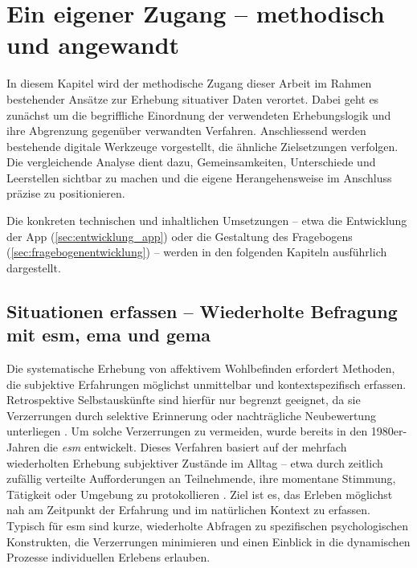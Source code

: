 
\section{Ein eigener Zugang -- methodisch und angewandt} \label{sec:methodik}

In diesem Kapitel wird der methodische Zugang dieser Arbeit im Rahmen bestehender Ansätze zur Erhebung situativer Daten verortet. Dabei geht es zunächst um die begriffliche Einordnung der verwendeten Erhebungslogik und ihre Abgrenzung gegenüber verwandten Verfahren. Anschliessend werden bestehende digitale Werkzeuge vorgestellt, die ähnliche Zielsetzungen verfolgen. Die vergleichende Analyse dient dazu, Gemeinsamkeiten, Unterschiede und Leerstellen sichtbar zu machen und die eigene Herangehensweise im Anschluss präzise zu positionieren.


Die konkreten technischen und inhaltlichen Umsetzungen -- etwa die Entwicklung der App (\cref{sec:entwicklung_app}) oder die Gestaltung des Fragebogens (\cref{sec:fragebogenentwicklung}) -- werden in den folgenden Kapiteln ausführlich dargestellt.


\subsection{Situationen erfassen -- Wiederholte Befragung mit \acrshort{esm}, \acrshort{ema} und \acrshort{gema}}

Die systematische Erhebung von affektivem Wohlbefinden erfordert Methoden, die subjektive Erfahrungen möglichst unmittelbar und kontextspezifisch erfassen. Retrospektive Selbstauskünfte sind hierfür nur begrenzt geeignet, da sie Verzerrungen durch selektive Erinnerung oder nachträgliche Neubewertung unterliegen \parencite[\textit{Recall Bias},][]{kahnemanDevelopmentsMeasurementSubjective2006}. Um solche Verzerrungen zu vermeiden, wurde bereits in den 1980er-Jahren die \emph{\acrfull{esm}} entwickelt. Dieses Verfahren basiert auf der mehrfach wiederholten Erhebung subjektiver Zustände im Alltag -- etwa durch zeitlich zufällig verteilte Aufforderungen an Teilnehmende, ihre momentane Stimmung, Tätigkeit oder Umgebung zu protokollieren \parencite{csikszentmihalyiValidityReliabilityExperienceSampling1987}. Ziel ist es, das Erleben möglichst nah am Zeitpunkt der Erfahrung und im natürlichen Kontext zu erfassen. Typisch für \acrshort{esm} sind kurze, wiederholte Abfragen zu spezifischen psychologischen Konstrukten, die Verzerrungen minimieren und einen Einblick in die dynamischen Prozesse individuellen Erlebens erlauben.

